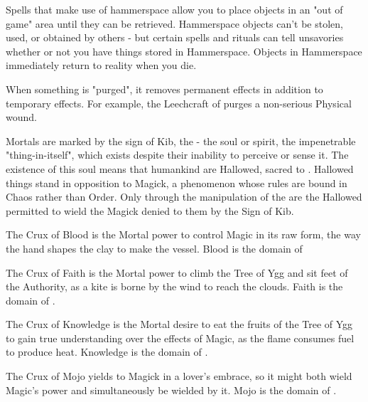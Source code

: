 {\begin{multicols}{2}
  Spells that make use of hammerspace allow you to place objects in an "out of game" area until they can be retrieved.  Hammerspace objects can't be stolen, used, or obtained by others - but certain spells and rituals can tell unsavories whether or not you have things stored in Hammerspace.  Objects in Hammerspace immediately return to reality when you die.

  
  When something is "purged", it removes permanent effects in addition to temporary effects.  For example, the Leechcraft of  purges a non-serious Physical wound.  

  \newpage


  Mortals are marked by the sign of Kib, the  - the soul or spirit, the impenetrable "thing-in-itself", which exists despite their inability to perceive or sense it.  The existence of this soul means that humankind are Hallowed, sacred to \TheAuthority. Hallowed things stand in opposition to Magick, a phenomenon whose rules are bound in Chaos rather than Order.  Only through the manipulation of the  are the Hallowed permitted to wield the Magick denied to them by the Sign of Kib.



  The Crux of Blood is the Mortal power to control Magic in its raw form, the way the hand shapes the clay to make the vessel. Blood is the domain of 


  The Crux of Faith is the Mortal power to climb the Tree of Ygg and sit feet of the Authority, as a kite is borne by the wind to reach the clouds. Faith is the domain of .


  The Crux of Knowledge is the Mortal desire to eat the fruits of the Tree of Ygg to gain true understanding over the effects of Magic, as the flame consumes fuel to produce heat. Knowledge is the domain of .


  The Crux of Mojo yields to Magick in a lover's embrace, so it might both wield Magic's power and simultaneously be wielded by it.  Mojo is the domain of .


\end{multicols}}
